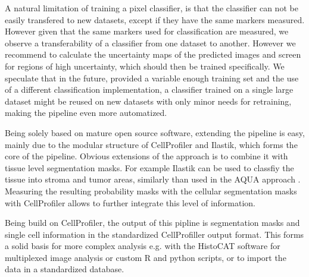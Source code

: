 \documentclass[a4paper]{article}
\begin{document}
A natural limitation of training a pixel classifier, is that the classifier can not be easily
transfered to new datasets, except if they have the same markers measured. However given that the
same markers used for classification are measured, we observe a transferability of a classifier
from one dataset to another. However we recommend to calculate the uncertainty maps of the predicted
images and screen for regions of high uncertainty, which should then be trained specifically. 
We speculate that in the future, provided a variable enough training
set and the use of a different classification implementation, a classifier trained on a single large dataset might be reused on new datasets with only minor
needs for retraining, making the pipeline even more automatized.


Being solely based on mature open source software, extending the pipeline is easy, mainly due to
the modular structure of CellProfiler and Ilastik, which forms the core of the pipeline.
Obvious extensions of the approach is to combine it with tissue level segmentation masks.
For example Ilastik can be used to classfiy the tissue into stroma and tumor areas, similarly
than used in the AQUA approach \cite{mccabe_automated_2005}. Measuring the resulting probability masks with the
cellular segmentation masks with CellProfiler allows to further integrate this level of
information.

Being build on CellProfiler, the output of this pipline is segmentation masks and single cell information in the standardized
CellProfiller output format. This forms a solid basis for more complex analysis e.g. with the
HistoCAT software for multiplexed image analysis or custom R and python scripts, or to import the
data in a standardized database.
\end{document}
